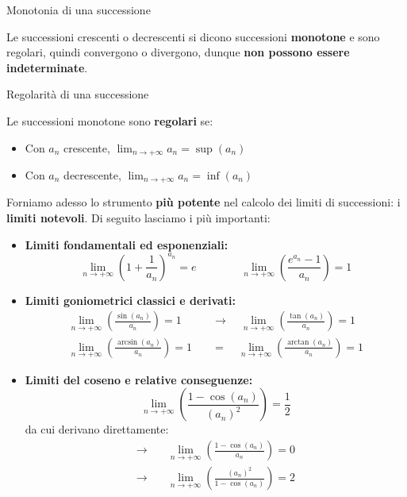 \documentclass[12pt]{report}
\begin{document}
	\begin{teorema}{Monotonia di una successione}{}
		
		Le successioni crescenti o decrescenti si dicono successioni \textbf{monotone} e sono regolari, quindi convergono o divergono, dunque \textbf{non possono essere indeterminate}.
		
	\end{teorema}
	
	\begin{teorema}{Regolarità di una successione}{}
		
		Le successioni monotone sono \textbf{regolari} se:
		\begin{itemize}
			
			\item Con $a_n$ crescente, $\lim_{n \to +\infty} a_n = \sup(a_n)$
			
			\item Con $a_n$ decrescente, $\lim_{n \to +\infty} a_n = \inf(a_n)$
			
		\end{itemize}
		
	\end{teorema}
	
	Forniamo adesso lo strumento \textbf{più potente} nel calcolo dei limiti di successioni: i \textbf{limiti notevoli}. Di seguito lasciamo i più importanti:
	\begin{itemize}
		
		\item \textbf{Limiti fondamentali ed esponenziali:}
		\[
		\lim_{n \to +\infty} \left(1 + \frac{1}{a_n}\right)^{a_n} = e 
		\qquad \qquad 
		\lim_{n \to +\infty} \left( \frac{e^{a_n} - 1}{a_n} \right) = 1
		\]
		
		\item \textbf{Limiti goniometrici classici e derivati:}
		\[
		\begin{aligned}
			\lim_{n \to +\infty} \left( \frac{\sin(a_n)}{a_n} \right) = 1 
			\quad &\longrightarrow \quad 
			\lim_{n \to +\infty} \left( \frac{\tan(a_n)}{a_n} \right) = 1 \\[1.5ex]
			\lim_{n \to +\infty} \left( \frac{\arcsin(a_n)}{a_n} \right) = 1 
			\quad &= \quad 
			\lim_{n \to +\infty} \left( \frac{\arctan(a_n)}{a_n} \right) = 1
		\end{aligned}
		\]
		
		\item \textbf{Limiti del coseno e relative conseguenze:}
		\[
		\lim_{n \to +\infty} \left( \frac{1 - \cos(a_n)}{(a_n)^2} \right) = \frac{1}{2}
		\]
		da cui derivano direttamente:
		\begin{align*}
			\longrightarrow \quad &\lim_{n \to +\infty} \left( \frac{1 - \cos(a_n)}{a_n} \right) = 0 \\[1ex]
			\longrightarrow \quad &\lim_{n \to +\infty} \left( \frac{(a_n)^2}{1 - \cos(a_n)} \right) = 2
		\end{align*}
		
	\end{itemize}
	
\end{document}
